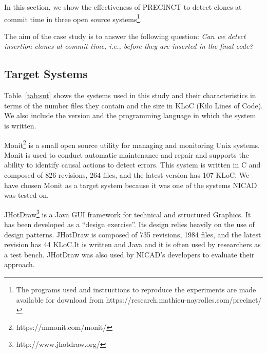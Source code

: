\documentclass[conference]{IEEEtran}
\begin{document}
In this section, we show the effectiveness of PRECINCT to
detect clones at commit time in three open source systems\footnote{The programs used and instructions to reproduce the experiments are made available for download from https://research.mathieu-nayrolles.com/precinct/}.

The aim of the case study is to answer the following question: \textit{Can we detect insertion clones at commit time, i.e., before they are inserted in the final code?}

\subsection{Target Systems}
\label{sub:Target Systems}

Table~\ref{tab:sut} shows the systems used in this study and their characteristics in terms of the number files they contain and the size in KLoC (Kilo Lines of Code). We also include the version and the programming language in which the system is written.

\begin{table}[]
\centering
\caption{List of Target Systems in Terms of Files and Kilo Line of Code (KLOC) at current version and Language}
\label{tab:sut}
\end{table}

Monit\footnote{https://mmonit.com/monit/} is a small open source utility for managing and monitoring Unix systems.
Monit is used to conduct automatic maintenance and repair and supports the ability to identify causal actions to detect errors.
This system is written in C and composed of 826 revisions, 264 files, and the latest version has 107 KLoC.
We have chosen Monit as a target system because it was one of the systems NICAD was tested on.

JHotDraw\footnote{http://www.jhotdraw.org/} is a Java GUI framework for technical and structured Graphics.
It has been developed as a ``design exercise''. Its design relies heavily on the use of design patterns. JHotDraw is composed of 735 revisions, 1984 files, and the latest revision has 44 KLoC.It is written and Java and it is often used by researchers as a test bench. JHotDraw was also used by NICAD's developers to evaluate their approach.
\end{document}
